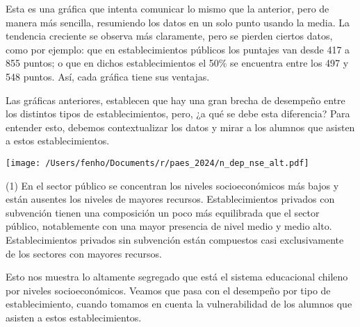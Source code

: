\documentclass[sin nombre,con autor]{plantilla-evaluacion-v1}
\begin{document}

Esta es una gráfica que intenta comunicar lo mismo que la anterior, pero de manera
más sencilla, resumiendo los datos en un solo punto usando la media.
La tendencia creciente se observa más claramente, pero se pierden ciertos datos,
como por ejemplo: que en establecimientos públicos los puntajes van desde 417 a 855
puntos; o que en dichos establecimientos el 50\% se encuentra entre los 497 y 548
puntos. Así, cada gráfica tiene sus ventajas. \par

Las gráficas anteriores, establecen que hay una gran brecha de
desempeño  entre los distintos tipos de
establecimientos, pero, ¿a qué se debe esta diferencia? Para entender esto,
debemos contextualizar los datos y mirar a los alumnos que asisten a estos
establecimientos.\par

\texttt{[image: /Users/fenho/Documents/r/paes\_2024/n\_dep\_nse\_alt.pdf]}

\begin{tasks}[style=itemize](1)
  \task
  En el sector público se concentran los niveles socioeconómicos más bajos y están ausentes
  los niveles de mayores recursos.
  \task
  Establecimientos privados con subvención tienen una composición un poco más equilibrada
  que el sector público, notablemente con una mayor presencia de nivel medio y medio alto.
  \task
  Establecimientos privados sin subvención están compuestos casi
  exclusivamente de los sectores con mayores recursos.
\end{tasks}

Esto nos muestra lo altamente segregado que está el sistema educacional chileno
por niveles socioeconómicos. Veamos que pasa con el desempeño por tipo
de establecimiento, cuando tomamos en cuenta la vulnerabilidad de los alumnos
que asisten a estos establecimientos. \par
\end{document}
